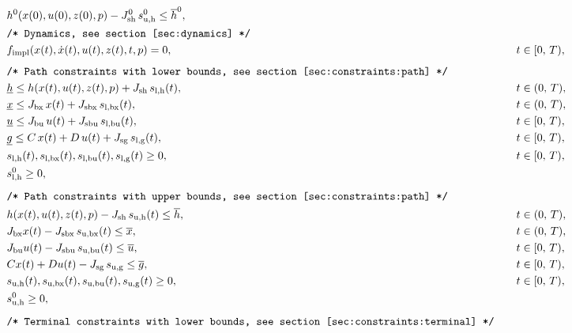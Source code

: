 \documentclass[english]{article}
\newcommand{\ind}[1]{_{\textrm{#1}}}
\newcommand{\initial}{^{\textrm{0}}}
\newcommand{\lowerh}{\ind{l,h}}
\newcommand{\lowerbx}{\ind{l,bx}}
\newcommand{\lowerbu}{\ind{l,bu}}
\newcommand{\lowerg}{\ind{l,g}}
\newcommand{\upperh}{\ind{u,h}}
\newcommand{\upperbx}{\ind{u,bx}}
\newcommand{\upperbu}{\ind{u,bu}}
\newcommand{\upperg}{\ind{u,g}}
\newcommand{\mathComment}[1]{\texttt{/* #1 */}}
\begin{document}
\begin{align}
    &&& h\initial(x(0), u(0),  z(0), p) - J\ind{sh}\initial\, s\ind{u,h}\initial \leq \overline{h}\initial, &&\label{eq:constraints:path:upper_bounds:start}\\
    &&&\mathComment{Dynamics, see section \ref{sec:dynamics}}\nonumber\\
    &&& f\ind{impl}(x(t), \dot{x}(t), u(t), z(t), t, p) = 0, &&\quad t \in [0,\,T), \label{eq:dynamics}\\[1ex]
    &&&\mathComment{Path constraints with lower bounds, see section \ref{sec:constraints:path}}\nonumber\\
    &&&\underline{h} \leq h(x(t), u(t), z(t), p) + J_{\textrm{sh}} \, s\lowerh(t), &&\quad t \in (0,\,T),\\
    &&&\underline{x} \leq J_{\textrm{bx}} \, x(t) + J_{\textrm{sbx}} \,s\lowerbx(t), &&\quad t \in (0,\,T),\\
    &&&\underline{u} \leq J_{\textrm{bu}} \,u(t) + J_{\textrm{sbu}} \,s\lowerbu(t), &&\quad t \in [0,\,T),\\
    &&&\underline{g} \leq C\,x(t) + D\,u(t) + J_{\textrm{sg}} \,s\lowerg(t), &&\quad t \in [0,\,T), \\
    &&& s\lowerh (t), s\lowerbx(t), s\lowerbu(t), s\lowerg(t) \geq 0, &&\quad t \in [0,\,T), \\
    &&& s\lowerh\initial \geq 0, && \label{eq:constraints:path:lower_bounds:end}\\[1ex]
    &&&\mathComment{Path constraints with upper bounds, see section \ref{sec:constraints:path}}\nonumber\\
    &&& h(x(t), u(t), z(t), p) - J_{\textrm{sh}} \, s\upperh(t) \leq \overline{h}, &&\quad t \in (0,\,T),\\
    &&& J_{\textrm{bx}} x(t) - J_{\textrm{sbx}}\, s\upperbx(t) \leq \overline{x}, &&\quad t \in (0,\,T),\\
    &&& J_{\textrm{bu}} u(t) - J_{\textrm{sbu}}\, s\upperbu(t)\leq \overline{u}, &&\quad t \in [0,\,T),\\
    &&& Cx(t) + Du(t) - J_{\textrm{sg}}\, s\upperg \leq \overline{g}, &&\quad t \in [0,\,T), \\
    &&& s\upperh(t), s\upperbx(t), s\upperbu(t), s\upperg(t) \geq 0, &&\quad t \in [0,\,T), \\
    &&& s\ind{u,h}\initial \geq 0, && \label{eq:constraints:path:upper_bounds:end}\\[1ex]
    &&&\mathComment{Terminal constraints with lower bounds, see section \ref{sec:constraints:terminal}}\nonumber\\

\end{align}
\end{document}
